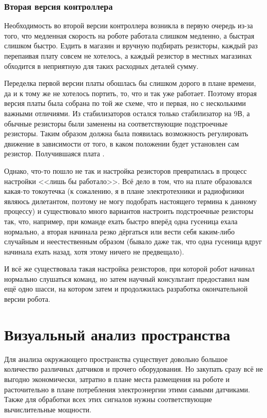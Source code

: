 \subsubsection{Вторая версия контроллера}

Необходимость во второй версии контроллера возникла в первую очередь из-за того, что медленная скорость на роботе работала слишком медленно, а быстрая слишком быстро. Ездить в магазин и вручную подбирать резисторы, каждый раз перепаивая плату совсем не хотелось, а каждый резистор в местных магазинах обходится в неприятную для таких расходных деталей сумму. 

Переделка первой версии платы обошлась бы слишком дорого в плане времени, да и к тому же не хотелось портить, то, что и так уже работает. Поэтому вторая версия платы была собрана по той же схеме, что и первая, но с несколькими важными отличиями. Из стабилизаторов остался только стабилизатор на 9В, а обычные резисторы были заменены на соответствующие подстроечные резисторы. Таким образом должна была появилась возможность регулировать движение в зависимости от того, в каком положении будет установлен сам резистор. Получившаяся плата .

Однако, что-то пошло не так и настройка резисторов превратилась в процесс настройки <<лишь бы работало>>. Всё дело в том, что на плате образовался какая-то токоутечка (к сожалению, я в плане электротехники и радиофизики являюсь дилетантом, поэтому не могу подобрать настоящего термина к данному процессу) и существовало много вариантов настроить подстроечные резисторы так, что, например, при команде ехать быстро вперёд одна гусеница ехала нормально, а вторая начинала резко дёргаться или вести себя каким-либо случайным и неестественным образом (бывало даже так, что одна гусеница вдруг начинала ехать назад, хотя этому ничего не предвещало).

И всё же существовала такая настройка резисторов, при которой робот начинал нормально слушаться команд, но затем научный консультант предоставил нам ещё одно шасси, на котором затем и продолжилась разработка окончательной версии робота.

\section{Визуальный анализ пространства}
Для анализа окружающего пространства существует довольно большое количество различных датчиков и прочего оборудования. Но закупать сразу всё не выгодно экономически, затратно в плане места размещения на роботе и расточительно в плане потребления электроэнергии этими самыми датчиками. Также для обработки всех этих сигналов нужны соответствующие вычислительные мощности. 

